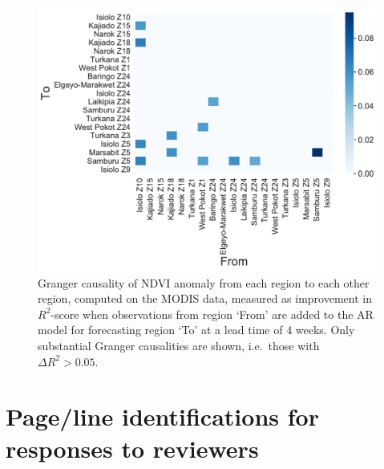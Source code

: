 \documentclass[review]{elsarticle}
\begin{document}
\begin{figure} 
	\centering
	\includegraphics[trim = 20mm 0mm 0mm 0mm,width=11 cm]{figures/GCheatmap2.pdf}
	\caption{Granger causality of NDVI anomaly from each region to each other region, computed on the MODIS data, measured as improvement in $R^2$-score when observations from region `From' are added to the AR model for forecasting region `To' at a lead time of 4 weeks. Only substantial Granger causalities are shown, i.e.~those with $\Delta R^2>0.05$.} \label{fig:GCheatmap}
\end{figure}




% 

\newpage
\listoffigures

\listoftables

\newpage
\section*{Page/line identifications for responses to reviewers }
\end{document}
